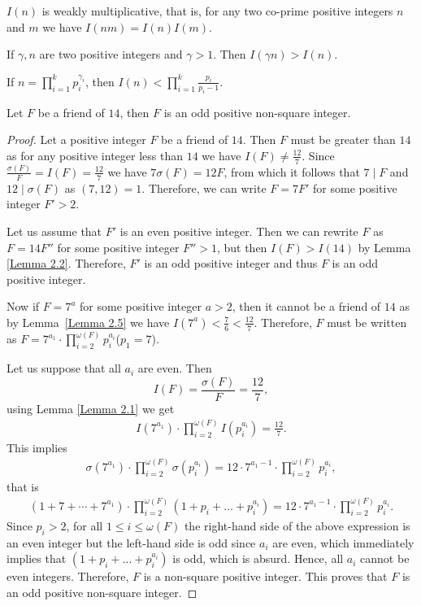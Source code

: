 \documentclass[10pt,a4paper]{amsart}
\begin{document}
\begin{lemma}\label{Lemma 2.1}
$I(n)$ is weakly multiplicative, that is, for any two co-prime positive integers $n$ and $m$ we have $I(nm)=I(n)I(m)$.
  \end{lemma}

\begin{lemma}\label{Lemma 2.2}
If $\gamma,n$ are two positive integers and $\gamma>1$. Then $I(\gamma n)>I(n)$.
\end{lemma}

\begin{lemma}\label{Lemma 2.5}
If $n=\displaystyle{\prod_{i=1}^{k}p_i^{\gamma_i}}$, then $\displaystyle{I(n)<\prod_{i=1}^{k}\frac{p_i}{p_i-1}}$.
\end{lemma}

\begin{theorem}\label{thm 3.1}
Let $F$ be a friend of $14$, then $F$ is an odd positive non-square integer.   
\end{theorem}

\begin{proof}
    Let a positive integer $F$ be a friend of $14$. Then $F$ must be greater than $14$ as for any positive integer less than $14$ we have $I(F)\neq \frac{12}{7}$. Since $\frac{\sigma(F)}{F}=I(F)=\frac{12}{7}$ we have $7\sigma(F)=12F$, from which it follows that $7\mid F$ and $12\mid \sigma(F)$ as $(7,12)=1$. Therefore, we can write $F=7F'$ for some positive integer $F'>2$. 

Let us  assume that $F'$ is an even positive integer. Then we can rewrite $F$ as $F=14F''$ for some positive integer $F''>1$, but then $I(F)>I(14)$ by Lemma \ref{Lemma 2.2}. Therefore, $F'$ is an odd positive integer and thus $F$ is an odd positive integer.

    Now if $F=7^a$ for some positive integer $a>2$, then it cannot be a friend of $14$ as by Lemma~\ref{Lemma 2.5} we have $I(7^{a})<\frac{7}{6}<\frac{12}{7}$. Therefore, $F$ must be written as $\displaystyle{F=7^{a_{1}}\cdot \prod_{i=2}^{\omega(F)}p_{i}^{a_{i}}}$($p_1=7$). 

Let us suppose that all $a_i$ are even. Then
$$I(F)=\frac{\sigma(F)}{F}=\frac{12}{7},$$
using Lemma \ref{Lemma 2.1} we get
\begin{align*}
   I(7^{a_1})\cdot \prod_{i=2}^{\omega(F)}I(p_{i}^{a_i})=\frac{12}{7}.
   \end{align*}
   This implies
   \begin{align*}
 \sigma(7^{a_1})\cdot \prod_{i=2}^{\omega(F)}\sigma(p_i^{a_i})=12\cdot7^{{a_1}-1}\cdot\prod_{i=2}^{\omega(F)}p_{i}^{a_i},
\end{align*}
that is
\begin{align*}
 (1+7+ \cdots +7^{a_1})\cdot\prod_{i=2}^{\omega(F)}(1+p_i+\dots+p_i^{a_i})=12\cdot7^{{a_1}-1}\cdot\prod_{i=2}^{\omega(F)}p_{i}^{a_i}.
\end{align*}
Since $p_i>2$, for all $1\leq i\leq \omega(F)$ the right-hand side of the above expression is an even integer but the left-hand side is odd since $a_i$ are even, which immediately implies that $(1+p_i+\dots+p_i^{a_i})$ is odd, which is absurd. Hence, all $a_i$ cannot be even integers. Therefore, $F$ is a non-square positive integer. This proves that $F$ is an odd positive non-square integer.
\end{proof}
\end{document}
